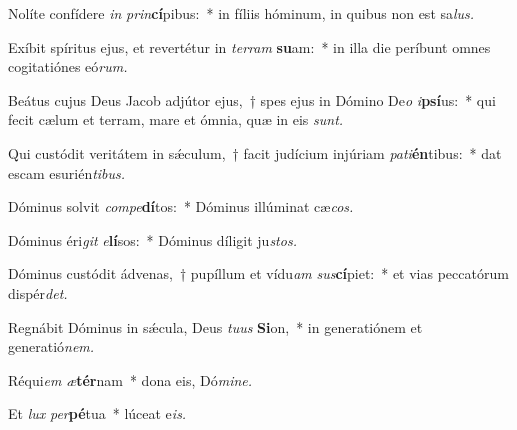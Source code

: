 \item Nolíte confídere \textit{in} \textit{prin}\textbf{cí}pibus:~* in fíliis hóminum, in quibus non est sa\hspace*{0.03em}\textit{lus.}
\item Exíbit spíritus ejus, et revertétur in \textit{terram} \textbf{su}am:~* in illa die períbunt omnes cogitatiónes eó\textit{rum.}
\item Beátus cujus Deus Jacob adjútor ejus,~† spes ejus in Dómino De\textit{o} \textit{i}\textbf{psí}us:~* qui fecit cælum et terram, mare et ómnia, quæ in eis \textit{sunt.}
\item Qui custódit veritátem in sǽculum,~† facit judícium injúriam \textit{pati}\textbf{én}tibus:~* dat escam esurién\textit{tibus.}
\item Dóminus solvit \textit{compe}\textbf{dí}tos:~* Dóminus illúminat cæ\hspace*{0.03em}\textit{cos.}
\item Dóminus éri\textit{git} \textit{e}\textbf{lí}sos:~* Dóminus díligit ju\hspace*{0.03em}\textit{stos.}
\item Dóminus custódit ádvenas,~† pupíllum et vídu\hspace*{0.03em}\textit{am} \textit{sus}\textbf{cí}piet:~* et vias peccatórum dispér\textit{det.}
\item Regnábit Dóminus in sǽcula, Deus \textit{tuus} \textbf{Si}on,~* in generatiónem et generatió\textit{nem.}
\item Réqui\hspace*{0.03em}\textit{em} \textit{æ}\textbf{tér}nam~* dona eis, Dó\textit{mine.}
\item Et \textit{lux} \textit{per}\textbf{pé}tua~* lúceat e\hspace*{0.03em}\textit{is.}